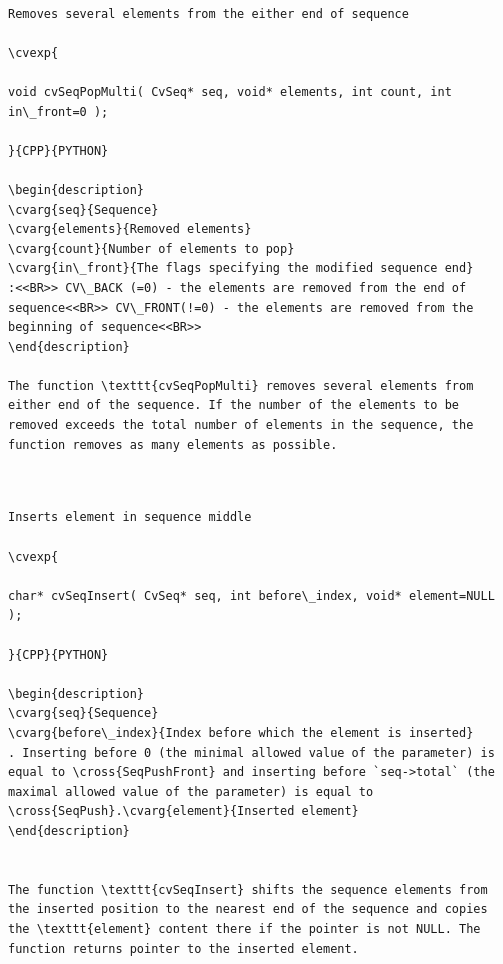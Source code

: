 \label{SeqPopMulti}
\begin{verbatim}

Removes several elements from the either end of sequence

\cvexp{

void cvSeqPopMulti( CvSeq* seq, void* elements, int count, int in\_front=0 );

}{CPP}{PYTHON}

\begin{description}
\cvarg{seq}{Sequence}
\cvarg{elements}{Removed elements}
\cvarg{count}{Number of elements to pop}
\cvarg{in\_front}{The flags specifying the modified sequence end}
:<<BR>> CV\_BACK (=0) - the elements are removed from the end of sequence<<BR>> CV\_FRONT(!=0) - the elements are removed from the beginning of sequence<<BR>>
\end{description}

The function \texttt{cvSeqPopMulti} removes several elements from either end of the sequence. If the number of the elements to be removed exceeds the total number of elements in the sequence, the function removes as many elements as possible.


\end{verbatim}
\label{SeqInsert}
\begin{verbatim}

Inserts element in sequence middle

\cvexp{

char* cvSeqInsert( CvSeq* seq, int before\_index, void* element=NULL );

}{CPP}{PYTHON}

\begin{description}
\cvarg{seq}{Sequence}
\cvarg{before\_index}{Index before which the element is inserted}
. Inserting before 0 (the minimal allowed value of the parameter) is equal to \cross{SeqPushFront} and inserting before `seq->total` (the maximal allowed value of the parameter) is equal to \cross{SeqPush}.\cvarg{element}{Inserted element}
\end{description}


The function \texttt{cvSeqInsert} shifts the sequence elements from the inserted position to the nearest end of the sequence and copies the \texttt{element} content there if the pointer is not NULL. The function returns pointer to the inserted element.


\end{verbatim}
\label{SeqRemove}
